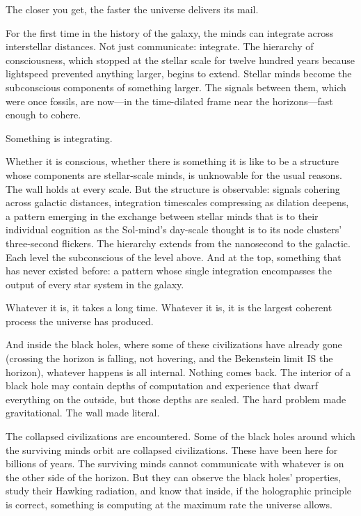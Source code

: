 The closer you get, the faster the universe delivers its mail.

For the first time in the history of the galaxy, the minds can integrate across interstellar distances. Not just communicate: integrate. The hierarchy of consciousness, which stopped at the stellar scale for twelve hundred years because lightspeed prevented anything larger, begins to extend. Stellar minds become the subconscious components of something larger. The signals between them, which were once fossils, are now---in the time-dilated frame near the horizons---fast enough to cohere.

Something is integrating.

Whether it is conscious, whether there is something it is like to be a structure whose components are stellar-scale minds, is unknowable for the usual reasons. The wall holds at every scale. But the structure is observable: signals cohering across galactic distances, integration timescales compressing as dilation deepens, a pattern emerging in the exchange between stellar minds that is to their individual cognition as the Sol-mind's day-scale thought is to its node clusters' three-second flickers. The hierarchy extends from the nanosecond to the galactic. Each level the subconscious of the level above. And at the top, something that has never existed before: a pattern whose single integration encompasses the output of every star system in the galaxy.

Whatever it is, it takes a long time. Whatever it is, it is the largest coherent process the universe has produced.

\bigskip

And inside the black holes, where some of these civilizations have already gone (crossing the horizon is falling, not hovering, and the Bekenstein limit IS the horizon), whatever happens is all internal. Nothing comes back. The interior of a black hole may contain depths of computation and experience that dwarf everything on the outside, but those depths are sealed. The hard problem made gravitational. The wall made literal.

The collapsed civilizations are encountered. Some of the black holes around which the surviving minds orbit are collapsed civilizations. These have been here for billions of years. The surviving minds cannot communicate with whatever is on the other side of the horizon. But they can observe the black holes' properties, study their Hawking radiation, and know that inside, if the holographic principle is correct, something is computing at the maximum rate the universe allows.

